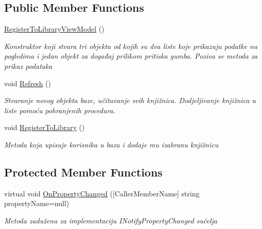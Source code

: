 \subsection*{Public Member Functions}
\begin{DoxyCompactItemize}
\item 
\mbox{\hyperlink{class_easy_library_application_1_1_w_p_f_1_1_view_model_1_1_register_to_library_view_model_a595b136e4fafc9d54558ef9ea81249a8}{Register\+To\+Library\+View\+Model}} ()
\begin{DoxyCompactList}\small\item\em Konstruktor koji stvara tri objekta od kojih su dva liste koje prikazuju podatke na pogledima i jedan objekt za događaj prilikom pritiska gumba. Poziva se metoda za prikaz podataka \end{DoxyCompactList}\item 
void \mbox{\hyperlink{class_easy_library_application_1_1_w_p_f_1_1_view_model_1_1_register_to_library_view_model_a8b864d9d781067de52ac2053912d0094}{Refresh}} ()
\begin{DoxyCompactList}\small\item\em Stvaranje novog objekta baze, učitavanje svih knjižnica. Dodjeljivanje knjižnica u liste pomoću pohranjenih procedura. \end{DoxyCompactList}\item 
void \mbox{\hyperlink{class_easy_library_application_1_1_w_p_f_1_1_view_model_1_1_register_to_library_view_model_a378d4e6524920d56dd979d92803797e6}{Register\+To\+Library}} ()
\begin{DoxyCompactList}\small\item\em Metoda koja upisuje korisnika u bazu i dodaje mu izabranu knjižnicu \end{DoxyCompactList}\end{DoxyCompactItemize}
\subsection*{Protected Member Functions}
\begin{DoxyCompactItemize}
\item 
virtual void \mbox{\hyperlink{class_easy_library_application_1_1_w_p_f_1_1_view_model_1_1_register_to_library_view_model_ab0d088de82b202d0e2e7b25f82a0e791}{On\+Property\+Changed}} (\mbox{[}Caller\+Member\+Name\mbox{]} string property\+Name=null)
\begin{DoxyCompactList}\small\item\em Metoda zadužena za implementaciju I\+Notify\+Property\+Changed sučelja \end{DoxyCompactList}\end{DoxyCompactItemize}
